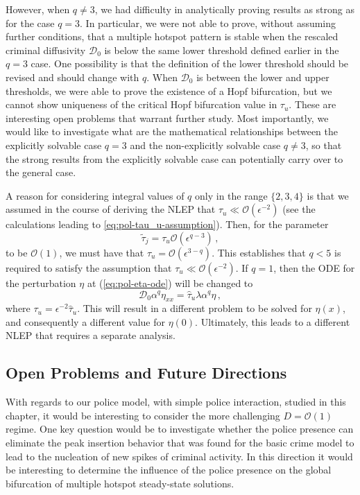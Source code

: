 \documentclass{article}%
\begin{document}
However, when $q\neq3$, we had difficulty in analytically proving
results as strong as for the case $q=3$. In particular, we were not
able to prove, without assuming further conditions, that a multiple
hotspot pattern is stable when the rescaled criminal diffusivity
${\mathcal D}_{0}$ is below the same lower threshold defined earlier
in the $q=3$ case. One possibility is that the definition of the lower
threshold should be revised and should change with $q$. When
${\mathcal D}_{0}$ is between the lower and upper thresholds, we were
able to prove the existence of a Hopf bifurcation, but we cannot show
uniqueness of the critical Hopf bifurcation value in $\tau_{u}$. These
are interesting open problems that warrant further study. Most
importantly, we would like to investigate what are the mathematical
relationships between the explicitly solvable case $q=3$ and the
non-explicitly solvable case $q\neq3$, so that the strong results from
the explicitly solvable case can potentially carry over to the general
case.

A reason for considering integral values of $q$ only in the range
$\{2,3,4\}$ is that we assumed in the course of deriving the NLEP
that $\tau_{u}\ll {\mathcal O}(\epsilon^{-2})$
(see the calculations leading to \ref{eq:pol-tau_u-assumption}). Then,
for the parameter
\[
\tilde{\tau}_{j}=\tau_{u}{\mathcal O}(\epsilon^{q-3})\,,
\]
to be ${\mathcal O}(1)$, we must have that $\tau_{u}={\mathcal
  O}(\epsilon^{3-q})$. This establishes that $q<5$ is required to
satisfy the assumption that $\tau_{u}\ll {\mathcal O}(\epsilon^{-2})$.
If $q=1$, then the ODE for the perturbation $\eta$ at
(\ref{eq:pol-eta-ode}) will be changed to
\[
{\mathcal D}_{0}\alpha^{q}\eta_{xx}=\hat{\tau}_u\lambda\alpha^{q}\eta\,,
\]
where $\tau_u=\epsilon^{-2}\hat{\tau}_u$. This will result in a
different problem to be solved for $\eta(x)$, and consequently a
different value for $\eta(0)$. Ultimately, this leads to a different
NLEP that requires a separate analysis.


\subsection{Open Problems and Future Directions}

With regards to our police model, with simple police interaction,
studied in this chapter, it would be interesting to consider the more
challenging $D={\mathcal O}(1)$ regime. One key question would be to
investigate whether the police presence can eliminate the peak
insertion behavior that was found for the basic crime model to lead to
the nucleation of new spikes of criminal activity. In this direction
it would be interesting to determine the influence of the police
presence on the global bifurcation of multiple hotspot steady-state
solutions.
\end{document}
